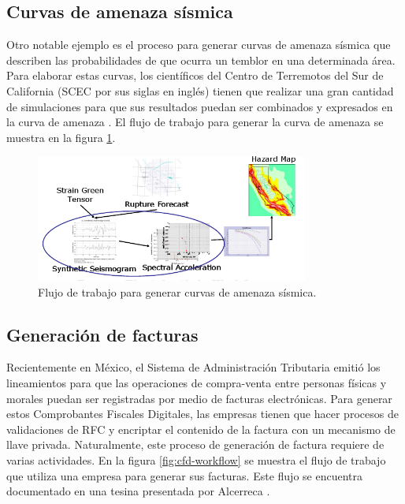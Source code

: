 \subsection{Curvas de amenaza sísmica}
Otro notable ejemplo es el proceso para generar curvas de amenaza sísmica que describen las probabilidades de que ocurra un temblor en una determinada área. Para elaborar estas curvas, los científicos del Centro de Terremotos del Sur de California (SCEC por sus siglas en inglés) tienen que realizar una gran cantidad de simulaciones para que sus resultados puedan ser combinados y expresados en la curva de amenaza \cite{deelman2006managing}. El flujo de trabajo para generar la curva de amenaza se muestra en la figura \ref{fig:scec-workflow}.

\begin{figure}
    \begin{center}
        \includegraphics[width=0.8\textwidth]{imagenes/scec-workflow}
    \end{center}
    \caption{Flujo de trabajo para generar curvas de amenaza sísmica.}
    \label{fig:scec-workflow}
\end{figure}

\subsection{Generación de facturas}
Recientemente en México, el Sistema de Administración Tributaria emitió los lineamientos para que las operaciones de compra-venta entre personas físicas y morales puedan ser registradas por medio de facturas electrónicas. Para generar estos Comprobantes Fiscales Digitales, las empresas tienen que hacer procesos de validaciones de RFC y encriptar el contenido de la factura con un mecanismo de llave privada. Naturalmente, este proceso de generación de factura requiere de varias actividades. En la figura \ref{fig:cfd-workflow} se muestra el flujo de trabajo que utiliza una empresa para generar sus facturas. Este flujo se encuentra documentado en una tesina presentada por Alcerreca \cite{alcerreca2013cfd}.

